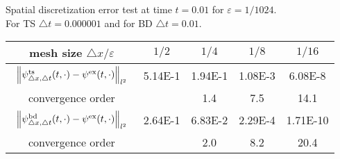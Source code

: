 \documentclass[leqno,final]{siamltex}
\numberwithin{equation}{section}
\newcounter{me}
\begin{document}
\begin{table}[htbp]
\begin{center}
{Spatial discretization error test at time $t=0.01$ for ${{\varepsilon }}=1/1024$.\\
For TS ${\triangle} t=0.000001$ and for BD  ${\triangle} t=0.01$. }
\begin{tabular}{c|cccc}\hline
mesh size ${\triangle} x/{{\varepsilon }}$& $1/2$ & $1/4$ & $1/8$ &   $1/16$ \\ \hline
$\begin{array}{c}\vspace*{-4mm} \\
\left\|\psi^{\rm ts}_{{\triangle} x,{\triangle} t}(t,\cdot)-\psi^{\rm
ex}(t,\cdot)\right\|_{l^2}\\ \vspace*{-4mm} \end{array}$
 &  5.14E-1 & 1.94E-1 &  1.08E-3 & 6.08E-8 \\ \hline
convergence order & & 1.4 & 7.5& 14.1 \\ \hline \hline
$\begin{array}{c}\vspace*{-4mm} \\
\left\|\psi^{\rm bd}_{{\triangle} x,{\triangle} t}(t,\cdot)-\psi^{\rm
ex}(t,\cdot)\right\|_{l^2}\\ \vspace*{-4mm} \end{array}$
 &  2.64E-1& 6.83E-2 &  2.29E-4 &  1.71E-10 \\ \hline
convergence order & & 2.0& 8.2& 20.4  \\ \hline 
\end{tabular}
\end{center}
\end{table}
\end{document}
